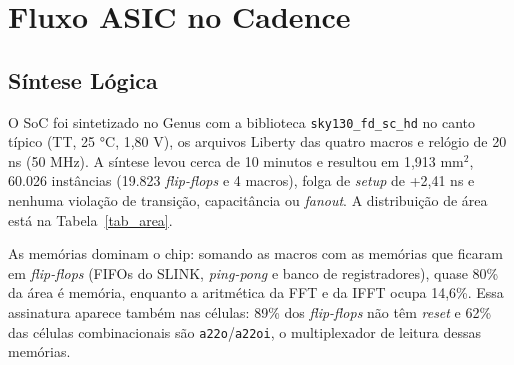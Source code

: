 \documentclass[conference]{IEEEtran}
\begin{document}
\section{Fluxo ASIC no Cadence}

\subsection{Síntese Lógica}
O SoC foi sintetizado no Genus \cite{b11} com a biblioteca \texttt{sky130\_fd\_sc\_hd} no canto típico (TT, 25 °C, 1,80 V), os arquivos Liberty das quatro macros e relógio de 20 ns (50 MHz). A síntese levou cerca de 10 minutos e resultou em 1,913 mm$^2$, 60.026 instâncias (19.823 \textit{flip-flops} e 4 macros), folga de \textit{setup} de +2,41 ns e nenhuma violação de transição, capacitância ou \textit{fanout}. A distribuição de área está na Tabela~\ref{tab_area}.

\begin{table}[htbp]
\caption{Distribuição de área na síntese do SoC}
\label{tab_area}
\begin{center}
\end{center}
\end{table}

As memórias dominam o chip: somando as macros com as memórias que ficaram em \textit{flip-flops} (FIFOs do SLINK, \textit{ping-pong} e banco de registradores), quase 80\% da área é memória, enquanto a aritmética da FFT e da IFFT ocupa 14,6\%. Essa assinatura aparece também nas células: 89\% dos \textit{flip-flops} não têm \textit{reset} e 62\% das células combinacionais são \texttt{a22o}/\texttt{a22oi}, o multiplexador de leitura dessas memórias.
\end{document}
